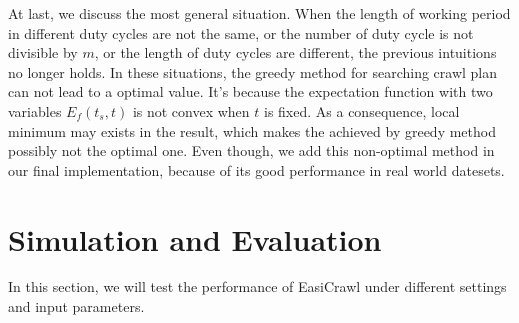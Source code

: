 \documentclass[conference]{IEEEtran}
\begin{document}
At last, we discuss the most general situation. 
When the length of working period in different duty cycles are not the same, or the number of duty cycle is not divisible by $m$, or the length of duty cycles are different, the previous intuitions no longer holds.
In these situations, the greedy method for searching crawl plan can not lead to a optimal value. 
It's because the expectation function with two variables $E_f(t_s,t)$ is not convex when $t$ is fixed.
As a consequence, local minimum may exists in the result, which makes the achieved by greedy method possibly not the optimal one.
Even though, we add this non-optimal method in our final implementation, because of its good performance in real world datesets.

\section{Simulation and Evaluation} \label{simulation}

In this section, we will test the performance of EasiCrawl under different settings and input parameters. 
\end{document}
